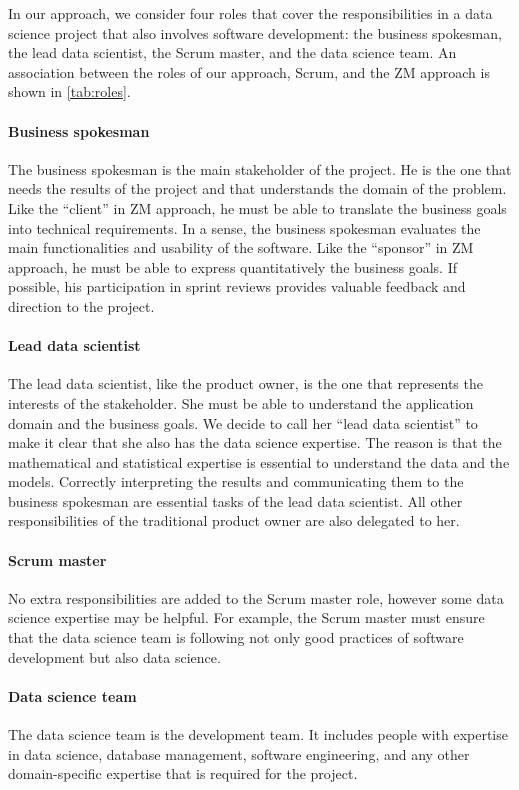 In our approach, we consider four roles that cover the responsibilities in a data science
project that also involves software development: the business spokesman, the lead data
scientist, the Scrum master, and the data science team.  An association between the roles of
our approach, Scrum, and the ZM approach is shown in \cref{tab:roles}.

\paragraph{Business spokesman}  The business spokesman is the main stakeholder of the project.
He is the one that needs the results of the project and that understands the domain of the
problem.  Like the ``client'' in ZM approach, he must be able to translate the business
goals into technical requirements.  In a sense, the business spokesman evaluates the main
functionalities and usability of the software.  Like the ``sponsor'' in ZM approach, he
must be able to express quantitatively the business goals.  If possible, his participation
in sprint reviews provides valuable feedback and direction to the project.

\paragraph{Lead data scientist}  The lead data scientist, like the product owner, is the
one that represents the interests of the stakeholder.  She must be able to understand the
application domain and the business goals.  We decide to call her ``lead data scientist''
to make it clear that she also has the data science expertise.  The reason is that the
mathematical and statistical expertise is essential to understand the data and the models.
Correctly interpreting the results and communicating them to the business spokesman are
essential tasks of the lead data scientist.  All other responsibilities of the traditional
product owner are also delegated to her.

\paragraph{Scrum master} No extra responsibilities are added to the Scrum master role,
however some data science expertise may be helpful.  For example, the Scrum master must
ensure that the data science team is following not only good practices of software
development but also data science.

\paragraph{Data science team}  The data science team is the development team.  It includes
people with expertise in data science, database management, software engineering, and any
other domain-specific expertise that is required for the project.

